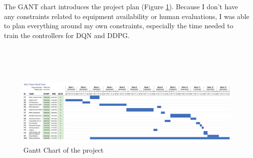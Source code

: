 The GANT chart introduces the project plan (Figure \ref{gantt}). Because I don't have any constraints related to equipment availability or human evaluations, I was able to plan everything around my own constraints, especially the time needed to train the controllers for DQN and DDPG. \\

\begin{landscape}
\phantom{centering}\\
\phantom{centering}\\
\phantom{centering}\\
\begin{figure}[H]
\includegraphics[angle=0, scale=0.092]{Figures/gantt.png}
\caption{Gantt Chart of the project}
\label{gantt}
\end{figure}
\end{landscape}
